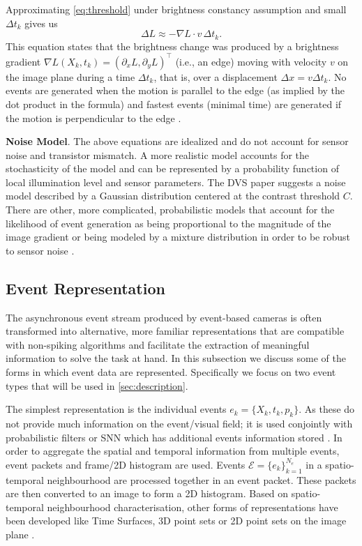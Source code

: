 \documentclass[10pt]{report}
\begin{document}
Approximating \autoref{eq:threshold} under brightness constancy assumption and small $\Delta t_{k}$ gives us
\begin{equation}
    \Delta L \approx - \nabla L \cdot v\, \Delta t_k.
\end{equation}
This equation states that the brightness change was produced by a brightness gradient $\nabla L (X_{k},t_{k}) = (\partial_{x} L , \partial_{y} L )^{\top}$ (i.e., an edge) moving with velocity $v$ on the image plane during a time $\Delta t_k$, that is, over a displacement $\Delta x = v \Delta t_k$. 
No events are generated when the motion is parallel to the edge (as implied by the dot product in the formula) and fastest events (minimal time) are generated if the motion is perpendicular to the edge \cite{Bryner19icra}.

\textbf{Noise Model}. 
The above equations are idealized and do not account for sensor noise and transistor mismatch. 
A more realistic model accounts for the stochasticity of the model and can be represented by a probability function of local illumination level and sensor parameters. 
The DVS \cite{Lichtsteiner08ssc} paper suggests a noise model described by a Gaussian distribution centered at the contrast threshold $C$. 
There are other, more complicated, probabilistic models that account for the likelihood of event generation as being proportional to the magnitude of the image gradient \cite{Censi14icra} or being modeled by a mixture distribution in order to be robust to sensor noise \cite{Gallego17pami}.


\subsection{Event Representation}
\label{sec:event-representation}
The asynchronous event stream produced by event-based cameras is often transformed into alternative, more familiar representations that are compatible with non-spiking algorithms and facilitate the extraction of meaningful information to solve the task at hand. 
In this subsection we discuss some of the forms in which event data are represented. 
Specifically we focus on two event types that will be used in \autoref{sec:description}. 

The simplest representation is the individual events $e_{k} = \{ X_{k},t_{k},p_{k}\}$. 
As these do not provide much information on the event/visual field; it is used conjointly with probabilistic filters or SNN which has additional events information stored \cite{Gallego17pami}.
In order to aggregate the spatial and temporal information from multiple events, event packets and frame/2D histogram are used. 
Events $\mathcal{E} = \{e_{k}\}_{k=1}^{N_{e}}$ in a spatio-temporal neighbourhood are processed together in an event packet. 
These packets are then converted to an image to form a 2D histogram. 
Based on spatio-temporal neighbourhood characterisation, other forms of representations have been developed like Time Surfaces\cite{Delbruck08issle}, 3D point sets \cite{Benosman14tnnls} or 2D point sets on the image plane \cite{Ni12tro}.
\end{document}
